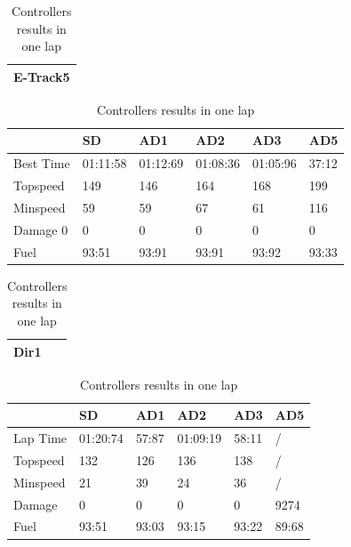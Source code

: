 \documentclass{llncs}
\begin{document}
\begin{table} [h!] 
	
	\caption{Controllers results in one lap}
	\label{resulta11}
	\begin{tabular}{ |p{15.2cm}|}
		\hline
		\textbf{E-Track5}   
		\\
		\hline
	\end{tabular}
	\begin{tabular}{ |p{3cm}|p{2cm}|p{2cm}|p{2 cm}|p{2 cm}|p{2 cm}|}
		\hline
		&
		{ \color{red}\textbf{SD}}&  
		{ \color{red} \textbf{AD1} } &
		{ \color{red} \textbf{AD2} } &
		{ \color{red} \textbf{AD3} } &
		{ \color{red} \textbf{AD5} }
		\\
		\hline
		Best Time &
		01:11:58 & 01:12:69&  01:08:36 & 01:05:96 & 37:12 
		\\
		\hline
		Topspeed & 149   & 146 & 164& 168 & 199 
		\\
		\hline
		Minspeed & 59 & 59 & 67 & 61  & 116
		\\
		\hline 
		
		Damage 0 & 0 & 0 & 0 & 0 & 0 
		\\
		\hline 
		Fuel & 93:51  & 93:91 & 93:91 & 93:92 & 93:33
		\\
		\hline 
		
	\end{tabular}
	\begin{tabular}{ |p{15.2cm}|}
		\hline
		\textbf{Dir1}   
		\\
		\hline
	\end{tabular}
	\begin{tabular}{ |p{3cm}|p{2cm}|p{2cm}|p{2 cm}|p{2 cm}|p{2 cm}|}
		\hline
		&
		{ \color{red}\textbf{SD}}&  
		{ \color{red} \textbf{AD1} } &
		{ \color{red} \textbf{AD2} } &
		{ \color{red} \textbf{AD3} } &
		{ \color{red} \textbf{AD5} }
		\\
		\hline
		Lap Time &  01:20:74 & 57:87 & 01:09:19 & 58:11 & / 
		\\
		\hline
		Topspeed & 132  & 126 & 136 & 138 & /
		\\
		\hline
		Minspeed &  21 & 39 & 24 & 36 & /
		\\
		\hline 
		
		Damage &  0 & 0 & 0 & 0 & 9274 
		\\
		\hline 
		Fuel & 93:51 & 93:03 & 93:15 & 93:22 & 89:68
		\\
		\hline
		
	\end{tabular}
	

\end{table}
\end{document}
